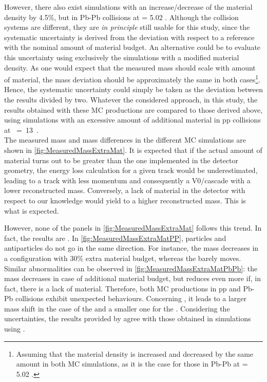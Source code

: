 However, there also exist simulations with an increase/decrease of the material density by 4.5\%, but in Pb-Pb collisions at \sqrtSnn = 5.02 \tev. Although the collision systems are different, they are \textit{in principle} still usable for this study, since the systematic uncertainty is derived from the deviation with respect to a reference with the nominal amount of material budget. An alternative could be to evaluate this uncertainty using exclusively the simulations with a modified material density. As one would expect that the measured mass should scale with amount of material, the mass deviation should be approximately the same in both cases\footnote{Assuming that the material density is increased and decreased by the same amount in both MC simulations, as it is the case for those in Pb-Pb at \sqrtSnn = 5.02 \tev.}. Hence, the systematic uncertainty could simply be taken as the deviation between the results divided by two. Whatever the considered approach, in this study, the results obtained with these MC productions are compared to those derived above, \ie using simulations with an excessive amount of additional material in pp collisions at \sqrtS~=~13~\tev.\\

The measured mass and mass differences in the different MC simulations are shown in \fig\ref{fig:MeasuredMassExtraMat}. It is expected that if the actual amount of material turns out to be greater than the one implemented in the detector geometry, the energy loss calculation for a given track would be underestimated, leading to a track with less momentum and consequently a V0/cascade with a lower reconstructed mass. Conversely, a lack of material in the detector with respect to our knowledge would yield to a higher reconstructed mass. This is what is expected.

However, none of the panels in \figs\ref{fig:MeasuredMassExtraMat} follows this trend. In fact, the results are . In \fig\ref{fig:MeasuredMassExtraMatPP}, particles and antiparticles do not go in the same direction. For instance, the \rmAomegaP mass decreases in a configuration with 30\% extra material budget, whereas the \rmOmegaM barely moves. Similar abnormalities can be observed in \fig\ref{fig:MeasuredMassExtraMatPbPb}: the \rmKzeroS mass decreases in case of additional material budget, but reduces even more if, in fact, there is a lack of material. Therefore, both MC productions in pp and Pb-Pb collisions exhibit unexpected behaviours. Concerning \GeantThree, it leads to a larger mass shift in the case of the \rmLambda and a smaller one for the \rmKzeroS. Considering the uncertainties, the results provided by \GeantThree agree with those obtained in simulations using \GeantFour.

